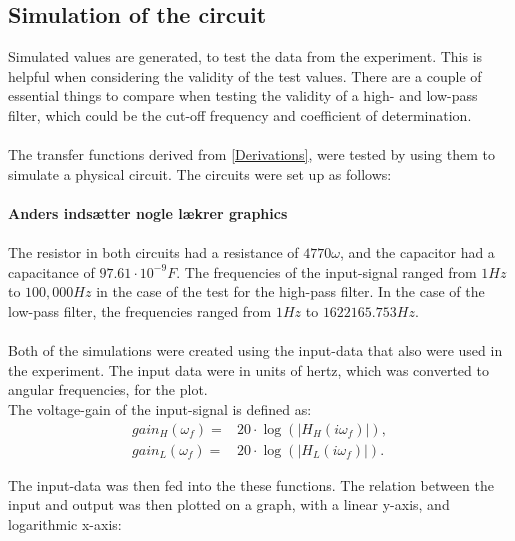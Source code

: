 \subsection{Simulation of the circuit}
Simulated values are generated, to test the data from the experiment. This is helpful when considering the validity of the test values. There are a couple of essential things to compare when testing the validity of a high- and low-pass filter, which could be the cut-off frequency and coefficient of determination. 
\\ \\
The transfer functions derived from \cref{Derivations}, were tested by using them to simulate a physical circuit. The circuits were set up as follows:
\\
\\
\textbf{Anders indsætter nogle lækrer graphics} 
\\
\\
The resistor in both circuits had a resistance of $4770 \omega$, and the capacitor had a capacitance of $97.61\cdot 10^{-9} F$. The frequencies of the input-signal ranged from $1 Hz$ to $100,000 Hz$ in the case of the test for the high-pass filter. In the case of the low-pass filter, the frequencies ranged from $1 Hz$ to $1622165.753 Hz$.
\\
\\
Both of the simulations were created using the input-data that also were used in the experiment. The input data were in units of hertz, which was converted to angular frequencies, for the plot.
\\
The voltage-gain of the input-signal is defined as:
\begin{align*}
	gain_H(\omega _f) =&20 \cdot \log{\left( \left|H_{H}(i \omega_f)\right| \right)},
	\\
	gain_L(\omega _f) =&20 \cdot \log{\left( \left|H_{L}(i \omega_f)\right| \right)}.
\end{align*}

\noindent The input-data was then fed into the these functions. The relation between the input and output was then plotted on a graph, with a linear y-axis, and logarithmic x-axis:

